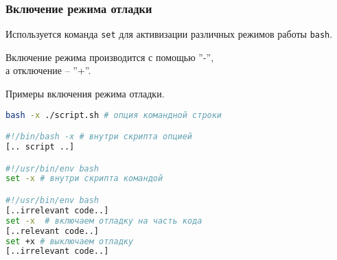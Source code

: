 \begin{frame}
	\frametitle{Включение режима отладки}
	Используется команда {\tt set} для активизации различных режимов работы {\tt bash}.

	Включение режима производится с помощью ''-'',\\
	а отключение -- ''+''.

	\begin{block}{Примеры включения режима отладки.}
		\begin{lstlisting}[language=sh]
bash -x ./script.sh # опция командной строки

#!/bin/bash -x # внутри скрипта опцией
[.. script ..]

#!/usr/bin/env bash
set -x # внутри скрипта командой 

#!/usr/bin/env bash
[..irrelevant code..]
set -x  # включаем отладку на часть кода
[..relevant code..]  
set +x # выключаем отладку
[..irrelevant code..]
		\end{lstlisting}
	\end{block}
\end{frame}
